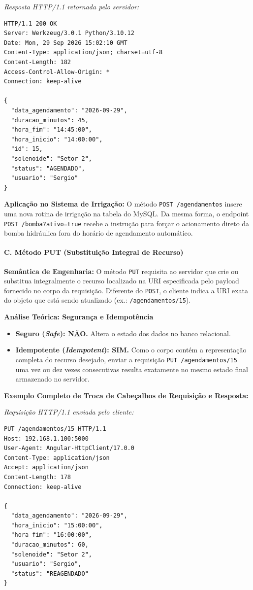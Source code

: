 \textit{Resposta HTTP/1.1 retornada pelo servidor:}
\begin{lstlisting}
HTTP/1.1 200 OK
Server: Werkzeug/3.0.1 Python/3.10.12
Date: Mon, 29 Sep 2026 15:02:10 GMT
Content-Type: application/json; charset=utf-8
Content-Length: 182
Access-Control-Allow-Origin: *
Connection: keep-alive

{
  "data_agendamento": "2026-09-29",
  "duracao_minutos": 45,
  "hora_fim": "14:45:00",
  "hora_inicio": "14:00:00",
  "id": 15,
  "solenoide": "Setor 2",
  "status": "AGENDADO",
  "usuario": "Sergio"
}
\end{lstlisting}

\textbf{Aplicação no Sistema de Irrigação:} O método \texttt{POST /agendamentos} insere uma nova rotina de irrigação na tabela do MySQL. Da mesma forma, o endpoint \texttt{POST /bomba?ativo=true} recebe a instrução para forçar o acionamento direto da bomba hidráulica fora do horário de agendamento automático.

\paragraph*{C. Método PUT (Substituição Integral de Recurso)}

\textbf{Semântica de Engenharia:} O método \texttt{PUT} requisita ao servidor que crie ou substitua integralmente o recurso localizado na URI especificada pelo payload fornecido no corpo da requisição. Diferente do \texttt{POST}, o cliente indica a URI exata do objeto que está sendo atualizado (ex.: \texttt{/agendamentos/15}).

\textbf{Análise Teórica: Segurança e Idempotência}
\begin{itemize}
    \item \textbf{Seguro (\textit{Safe}): NÃO.} Altera o estado dos dados no banco relacional.
    \item \textbf{Idempotente (\textit{Idempotent}): SIM.} Como o corpo contém a representação completa do recurso desejado, enviar a requisição \texttt{PUT /agendamentos/15} uma vez ou dez vezes consecutivas resulta exatamente no mesmo estado final armazenado no servidor.
\end{itemize}

\textbf{Exemplo Completo de Troca de Cabeçalhos de Requisição e Resposta:}

\textit{Requisição HTTP/1.1 enviada pelo cliente:}
\begin{lstlisting}
PUT /agendamentos/15 HTTP/1.1
Host: 192.168.1.100:5000
User-Agent: Angular-HttpClient/17.0.0
Content-Type: application/json
Accept: application/json
Content-Length: 178
Connection: keep-alive

{
  "data_agendamento": "2026-09-29",
  "hora_inicio": "15:00:00",
  "hora_fim": "16:00:00",
  "duracao_minutos": 60,
  "solenoide": "Setor 2",
  "usuario": "Sergio",
  "status": "REAGENDADO"
}
\end{lstlisting}

